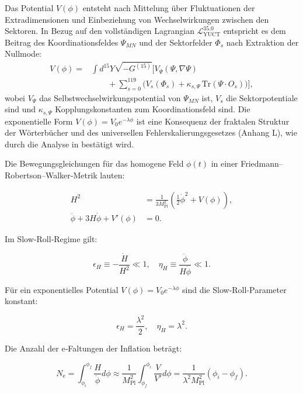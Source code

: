 \documentclass[12pt]{article}
\theoremstyle{remark}
\newcommand{\Mpl}{M_{\mathrm{Pl}}}
\newcommand{\ninf}{N_{\mathrm{e}}}
\begin{document}
	Das Potential $V(\phi)$ entsteht nach Mittelung über Fluktuationen der Extradimensionen und Einbeziehung von Wechselwirkungen zwischen den Sektoren. In Bezug auf den vollständigen Lagrangian $\mathcal{L}_{\text{YUCT}}^{35.0}$ entspricht es dem Beitrag des Koordinationsfeldes $\Psi_{MN}$ und der Sektorfelder $\Phi_s$ nach Extraktion der Nullmode:
	\begin{align}
		V(\phi) = &\int d^{15}Y \sqrt{-G^{(15)}} \Big[ V_{\Psi}(\Psi,\nabla\Psi) \nonumber\\
		&\qquad + \sum_{s=0}^{119} \big( V_s(\Phi_s) + \kappa_{s,\Psi}\,\mathrm{Tr}(\Psi\cdot O_s) \big) \Big],
	\end{align}
	wobei $V_{\Psi}$ das Selbstwechselwirkungspotential von $\Psi_{MN}$ ist, $V_s$ die Sektorpotentiale sind und $\kappa_{s,\Psi}$ Kopplungskonstanten zum Koordinationsfeld sind. Die exponentielle Form $V(\phi)=V_0 e^{-\lambda\phi}$ ist eine Konsequenz der fraktalen Struktur der Wörterbücher und des universellen Fehlerskalierungsgesetzes (Anhang L), wie durch die Analyse in \cite{Yakushev2026} bestätigt wird.
	
	Die Bewegungsgleichungen für das homogene Feld $\phi(t)$ in einer Friedmann–Robertson–Walker‑Metrik lauten:
	
	\begin{align}
		H^2 &= \frac{1}{3\Mpl^2} \left( \frac{1}{2}\dot{\phi}^2 + V(\phi) \right), \label{eq:friedman1} \\
		\ddot{\phi} + 3H\dot{\phi} + V'(\phi) &= 0. \label{eq:field}
	\end{align}
	
	Im Slow‑Roll‑Regime gilt:
	
	\begin{equation}
		\epsilon_H \equiv -\frac{\dot{H}}{H^2} \ll 1, \quad \eta_H \equiv \frac{\ddot{\phi}}{H\dot{\phi}} \ll 1.
	\end{equation}
	
	Für ein exponentielles Potential $V(\phi) = V_0 e^{-\lambda \phi}$ sind die Slow‑Roll‑Parameter konstant:
	
	\begin{equation}
		\epsilon_H = \frac{\lambda^2}{2}, \quad \eta_H = \lambda^2.
		\label{eq:slowroll}
	\end{equation}
	
	Die Anzahl der e‑Faltungen der Inflation beträgt:
	
	\begin{equation}
		\ninf = \int_{\phi_i}^{\phi_f} \frac{H}{\dot{\phi}} d\phi \approx \frac{1}{\Mpl^2} \int_{\phi_f}^{\phi_i} \frac{V}{V'} d\phi = \frac{1}{\lambda^2 \Mpl^2} (\phi_i - \phi_f).
	\end{equation}
	
\end{document}
